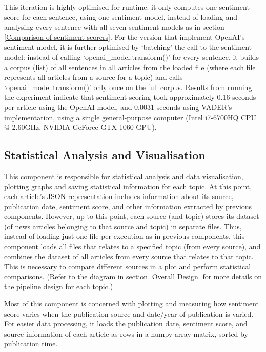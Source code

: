 \documentclass{report}
\begin{document}
This iteration is highly optimised for runtime: it only computes one sentiment score for each sentence, using one sentiment model, instead of loading and analysing every sentence with all seven sentiment models as in section \ref{Comparison of sentiment scorers}.
For the version that implement OpenAI's sentiment model, it is further optimised by `batching' the call to the sentiment model: instead of calling `openai\_model.transform()' for every sentence, it builds a corpus (list) of all sentences in all articles from the loaded file (where each file represents all articles from a source for a topic) and calls `openai\_model.transform()' only once on the full corpus.
Results from running the experiment indicate that sentiment scoring took approximately 0.16 seconds per article using the OpenAI model, and 0.0031 seconds using VADER's implementation, using a single general-purpose computer (Intel i7-6700HQ CPU @ 2.60GHz, NVIDIA GeForce GTX 1060 GPU).

\subsection{Statistical Analysis and Visualisation} \label{des-visualisation}

This component is responsible for statistical analysis and data visualisation, plotting graphs and saving statistical information for each topic.
At this point, each article's JSON representation includes information about its source, publication date, sentiment score, and other information extracted by previous components.
However, up to this point, each source (and topic) stores its dataset (of news articles belonging to that source and topic) in separate files.
Thus, instead of loading just one file per execution as in previous components, this component loads all files that relates to a specified topic (from every source), and combines the dataset of all articles from every source that relates to that topic.
This is necessary to compare different sources in a plot and perform statistical comparisons.
(Refer to the diagram in section \ref{Overall Design} for more details on the pipeline design for each topic.)

Most of this component is concerned with plotting and measuring how sentiment score varies when the publication source and date/year of publication is varied.
For easier data processing, it loads the publication date, sentiment score, and source information of each article as rows in a numpy array matrix, sorted by publication time.
\end{document}
